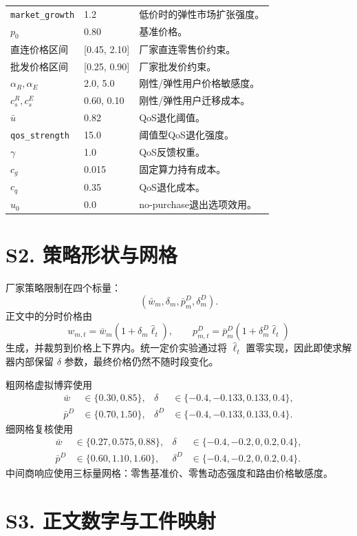 \documentclass[UTF8,11pt]{ctexart}
\begin{document}
\begin{longtable}{p{}p{}p{}}
\texttt{market\_growth} & 1.2 & 低价时的弹性市场扩张强度。 \\
$p_0$ & 0.80 & 基准价格。 \\
直连价格区间 & [0.45, 2.10] & 厂家直连零售价约束。 \\
批发价格区间 & [0.25, 0.90] & 厂家批发价约束。 \\
$\alpha_R,\alpha_E$ & 2.0, 5.0 & 刚性/弹性用户价格敏感度。 \\
$c_s^R,c_s^E$ & 0.60, 0.10 & 刚性/弹性用户迁移成本。 \\
$\bar u$ & 0.82 & QoS退化阈值。 \\
\texttt{qos\_strength} & 15.0 & 阈值型QoS退化强度。 \\
$\gamma$ & 1.0 & QoS反馈权重。 \\
$c_g$ & 0.015 & 固定算力持有成本。 \\
$c_q$ & 0.35 & QoS退化成本。 \\
$u_0$ & 0.0 & no-purchase退出选项效用。 \\
\bottomrule
\end{longtable}

\section*{S2. 策略形状与网格}

厂家策略限制在四个标量：
\[
  (\bar w_m,\delta_m,\bar p^D_m,\delta^D_m).
\]
正文中的分时价格由
\[
  w_{m,t}=\bar w_m(1+\delta_m\widehat{\ell}_t),\qquad
  p^D_{m,t}=\bar p^D_m(1+\delta^D_m\widehat{\ell}_t)
\]
生成，并裁剪到价格上下界内。统一定价实验通过将
\(\widehat{\ell}_t\) 置零实现，因此即使求解器内部保留
\(\delta\) 参数，最终价格仍然不随时段变化。

粗网格虚拟博弈使用
\[
\begin{aligned}
\bar w&\in\{0.30,0.85\},&
\delta&\in\{-0.4,-0.133,0.133,0.4\},\\
\bar p^D&\in\{0.70,1.50\},&
\delta^D&\in\{-0.4,-0.133,0.133,0.4\}.
\end{aligned}
\]
细网格复核使用
\[
\begin{aligned}
\bar w&\in\{0.27,0.575,0.88\},&
\delta&\in\{-0.4,-0.2,0,0.2,0.4\},\\
\bar p^D&\in\{0.60,1.10,1.60\},&
\delta^D&\in\{-0.4,-0.2,0,0.2,0.4\}.
\end{aligned}
\]
中间商响应使用三标量网格：零售基准价、零售动态强度和路由价格敏感度。

\section*{S3. 正文数字与工件映射}
\end{document}

